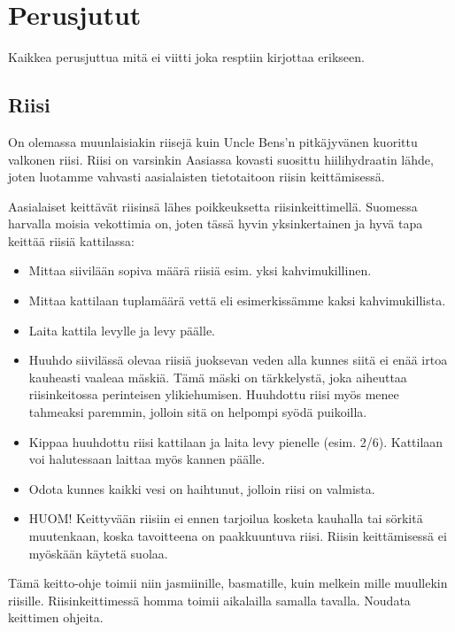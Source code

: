 \documentclass[../keittiokirja.tex]{subfiles}
\begin{document}
\section{Perusjutut}
\label{sec:perusjutut}

Kaikkea perusjuttua mitä ei viitti joka resptiin kirjottaa erikseen.

\subsection{Riisi}

On olemassa muunlaisiakin riisejä kuin Uncle Bens'n pitkäjyvänen kuorittu valkonen riisi. 
Riisi on varsinkin Aasiassa kovasti suosittu hiilihydraatin lähde, joten luotamme vahvasti 
aasialaisten tietotaitoon riisin keittämisessä.

Aasialaiset keittävät riisinsä lähes poikkeuksetta riisinkeittimellä. Suomessa harvalla moisia 
vekottimia on, joten tässä hyvin yksinkertainen ja hyvä tapa keittää riisiä kattilassa:

\begin{itemize}
	\item Mittaa siivilään sopiva määrä riisiä esim. yksi kahvimukillinen.
	\item Mittaa kattilaan tuplamäärä vettä eli esimerkissämme kaksi kahvimukillista.
	\item Laita kattila levylle ja levy päälle.
	\item Huuhdo siivilässä olevaa riisiä juoksevan veden alla kunnes siitä ei enää irtoa 
	kauheasti vaaleaa mäskiä. Tämä mäski on tärkkelystä, joka aiheuttaa riisinkeitossa perinteisen 
	ylikiehumisen. Huuhdottu riisi myös menee tahmeaksi paremmin, jolloin sitä on helpompi syödä 
	puikoilla.
	\item Kippaa huuhdottu riisi kattilaan ja laita levy pienelle (esim. 2/6). Kattilaan voi 
	halutessaan laittaa myös kannen päälle. 
	\item Odota kunnes kaikki vesi on haihtunut, jolloin riisi on valmista.
	\item HUOM! Keittyvään riisiin ei ennen tarjoilua kosketa kauhalla tai sörkitä muutenkaan,
	koska tavoitteena on paakkuuntuva riisi. Riisin keittämisessä ei myöskään käytetä suolaa.
\end{itemize}

Tämä keitto-ohje toimii niin jasmiinille, basmatille, kuin melkein mille muullekin riisille. 
Riisinkeittimessä homma toimii aikalailla samalla tavalla. Noudata keittimen ohjeita.
\end{document}
